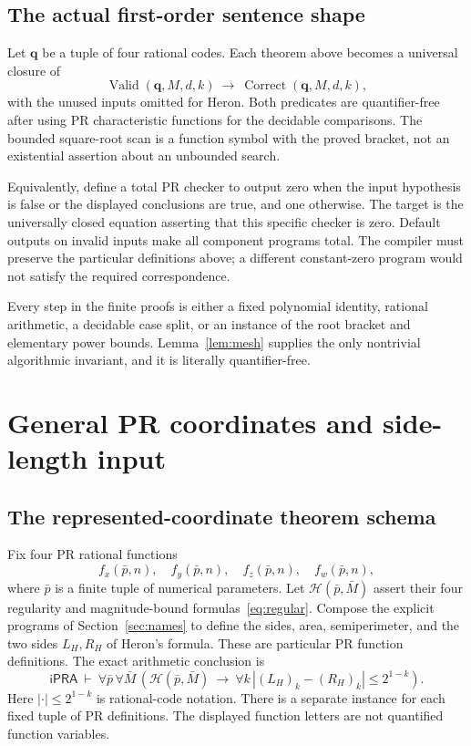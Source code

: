 \documentclass[11pt,a4paper]{article}
\theoremstyle{definition}
\newcommand{\ipra}{\mathsf{iPRA}}
\newcommand{\abs}[1]{\left|#1\right|}
\numberwithin{equation}{section}
\begin{document}
\subsection{The actual first-order sentence shape}

Let \(\mathbf q\) be a tuple of four rational codes. Each theorem
above becomes a universal closure of
\[
 \operatorname{Valid}(\mathbf q,M,d,k)
 \ \longrightarrow\
 \operatorname{Correct}(\mathbf q,M,d,k),
 \tag{8.7}
\]
with the unused inputs omitted for Heron. Both predicates are
quantifier-free after using PR characteristic functions for the
decidable comparisons. The bounded square-root scan is a function
symbol with the proved bracket, not an existential assertion about
an unbounded search.

Equivalently, define a total PR checker to output zero when the
input hypothesis is false or the displayed conclusions are true,
and one otherwise. The target is the universally closed equation
asserting that this specific checker is zero. Default outputs on
invalid inputs make all component programs total. The compiler
must preserve the particular definitions above; a different
constant-zero program would not satisfy the required correspondence.

Every step in the finite proofs is either a fixed polynomial
identity, rational arithmetic, a decidable case split, or an
instance of the root bracket and elementary power bounds.
Lemma~\ref{lem:mesh} supplies the only nontrivial algorithmic
invariant, and it is literally quantifier-free.

\section{General PR coordinates and side-length input}\label{sec:schema}

\subsection{The represented-coordinate theorem schema}

Fix four PR rational functions
\[
 f_x(\bar p,n),\quad f_y(\bar p,n),\quad
 f_z(\bar p,n),\quad f_w(\bar p,n),
\]
where \(\bar p\) is a finite tuple of numerical parameters. Let
\(\mathcal H(\bar p,\bar M)\) assert their four regularity and
magnitude-bound formulas~\eqref{eq:regular}.
Compose the explicit programs of Section~\ref{sec:names} to define
the sides, area, semiperimeter, and the two sides \(L_H,R_H\) of
Heron's formula. These are particular PR function definitions.
The exact arithmetic conclusion is
\[
 \ipra\ \vdash\
 \forall\bar p\,\forall\bar M\,
 \left(\mathcal H(\bar p,\bar M)\ \to\
       \forall k\,
       \abs{(L_H)_k-(R_H)_k}\le2^{1-k}\right).
 \tag{9.1}\label{eq:heron-schema}
\]
Here \(\abs{\cdot}\le2^{1-k}\) is rational-code notation.
There is a separate instance for each fixed tuple of PR definitions.
The displayed function letters are not quantified function variables.
\end{document}
